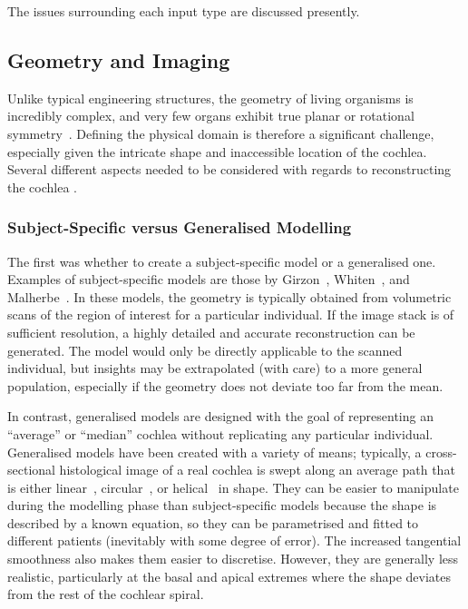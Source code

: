 The issues surrounding each input type are discussed presently.

\subsection{Geometry and Imaging}
\label{section:imaging}

Unlike typical engineering structures, the geometry of living organisms is
incredibly complex, and very few organs exhibit true planar or rotational
symmetry~\cite{miller1990}. Defining the physical domain is therefore a
significant challenge, especially given the intricate shape and inaccessible
location of the cochlea. Several different aspects needed to be considered with
regards to reconstructing the cochlea \insilico.

\subsubsection{Subject-Specific versus Generalised Modelling}

The first was whether to create a subject-specific model or a generalised one.
Examples of subject-specific models are those by Girzon~\cite{girzon1987},
Whiten~\cite{whiten2007}, and Malherbe~\cite{malherbe2013,malherbe2015}. In
these models, the geometry is typically obtained from volumetric scans of the
region of interest for a particular individual. If the image stack is of
sufficient resolution, a highly detailed and accurate reconstruction can be
generated. The model would only be directly applicable to the scanned
individual, but insights may be extrapolated (with care) to a more general
population, especially if the geometry does not deviate too far from the mean.

In contrast, generalised models are designed with the goal of representing an
``average'' or ``median'' cochlea without replicating any particular individual.
Generalised models have been created with a variety of means; typically, a
cross-sectional histological image of a real cochlea is swept along an average
path that is either
linear~\cite{finley1990,frijns1995,choi2001,saba2012,wong2012},
circular~\cite{choi2004,frijns1995}, or
helical~\cite{frijns2001,hanekom2001,rattay2001model,tognola2007,saba2012,kalkman2014}
in shape. They can be easier to manipulate during the modelling phase than
subject-specific models because the shape is described by a known equation, so
they can be parametrised and fitted to different patients (inevitably with some
degree of error). The increased tangential smoothness also makes them easier to
discretise. However, they are generally less realistic, particularly at the
basal and apical extremes where the shape deviates from the rest of the
cochlear spiral.

